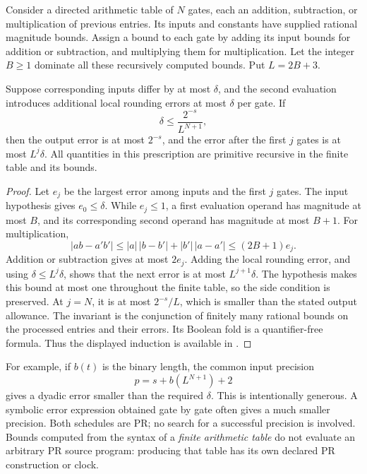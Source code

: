 \begin{lemma}
\label{core:gate}
Consider a directed arithmetic table of \(N\) gates, each an addition,
subtraction, or multiplication of previous entries.  Its inputs and
constants have supplied rational magnitude bounds.  Assign a bound to
each gate by adding its input bounds for addition or subtraction, and
multiplying them for multiplication.  Let the integer \(B\ge1\) dominate
all these recursively computed bounds.  Put \(L=2B+3\).

Suppose corresponding inputs differ by at most \(\delta\), and the second
evaluation introduces additional local rounding errors at most
\(\delta\) per gate.  If
\[
 \delta\le \frac{2^{-s}}{L^{N+1}},
\]
then the output error is at most \(2^{-s}\), and the error after the first
\(j\) gates is at most \(L^j\delta\).  All quantities in this prescription
are primitive recursive in the finite table and its bounds.
\end{lemma}

\begin{proof}
Let \(e_j\) be the largest error among inputs and the first \(j\) gates.
The input hypothesis gives \(e_0\le\delta\).  While \(e_j\le1\), a first
evaluation operand has magnitude at most \(B\), and its corresponding
second operand has magnitude at most \(B+1\).  For multiplication,
\[
 |ab-a'b'|
 \le |a|\,|b-b'|+|b'|\,|a-a'|
 \le(2B+1)e_j.
\]
Addition or subtraction gives at most \(2e_j\).  Adding the local
rounding error, and using \(\delta\le L^j\delta\), shows that the next
error is at most \(L^{j+1}\delta\).  The hypothesis makes this bound at
most one throughout the finite table, so the side condition is preserved.
At \(j=N\), it is at most \(2^{-s}/L\), which is smaller than the stated
output allowance.  The invariant is the conjunction of finitely many
rational bounds on the processed entries and their errors.  Its Boolean
fold is a quantifier-free formula.  Thus the displayed induction is
available in \ipra.
\end{proof}

For example, if \(b(t)\) is the binary length, the common input precision
\[
 p=s+b(L^{N+1})+2
\]
gives a dyadic error smaller than the required \(\delta\).
This is intentionally generous.  A symbolic error expression obtained
gate by gate often gives a much smaller precision.  Both schedules are
PR; no search for a successful precision is involved.  Bounds computed
from the syntax of a \emph{finite arithmetic table} do not evaluate an
arbitrary PR source program: producing that table has its own declared
PR construction or clock.

